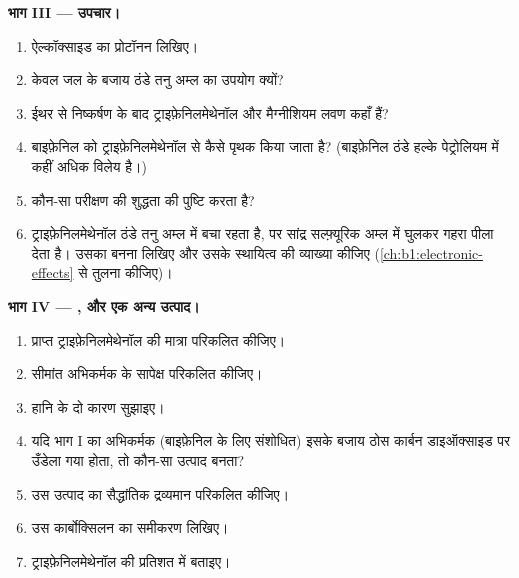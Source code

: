 \begin{problem}
\medskip
\noindent\textbf{भाग III --- उपचार।}
\begin{enumerate}[resume]
  \item ऐल्कॉक्साइड का प्रोटॉनन लिखिए।
  \item केवल जल के बजाय ठंडे तनु अम्ल का उपयोग क्यों?
  \item ईथर से निष्कर्षण के बाद ट्राइफ़ेनिलमेथेनॉल और मैग्नीशियम लवण
        कहाँ हैं?
  \item बाइफ़ेनिल को ट्राइफ़ेनिलमेथेनॉल से कैसे पृथक किया जाता है? (बाइफ़ेनिल ठंडे
        हल्के पेट्रोलियम में कहीं अधिक विलेय है।)
  \item कौन-सा परीक्षण  की शुद्धता की पुष्टि करता है?
  \item ट्राइफ़ेनिलमेथेनॉल ठंडे तनु अम्ल में बचा रहता है, पर
        सांद्र सल्फ़्यूरिक अम्ल में घुलकर गहरा पीला  देता है।
        उसका बनना लिखिए और उसके स्थायित्व की व्याख्या कीजिए
        (\cref{ch:b1:electronic-effects} से तुलना कीजिए)।
\end{enumerate}

\medskip
\noindent\textbf{भाग IV --- , और एक अन्य उत्पाद।}
\begin{enumerate}[resume]
  \item प्राप्त ट्राइफ़ेनिलमेथेनॉल की मात्रा परिकलित कीजिए।
  \item सीमांत अभिकर्मक के सापेक्ष  परिकलित कीजिए।
  \item हानि के दो कारण सुझाइए।
  \item यदि भाग I का अभिकर्मक (बाइफ़ेनिल के लिए संशोधित) इसके बजाय ठोस
        कार्बन डाइऑक्साइड पर उँडेला गया होता, तो कौन-सा उत्पाद बनता?
  \item उस उत्पाद का सैद्धांतिक द्रव्यमान परिकलित कीजिए।
  \item उस कार्बोक्सिलन का समीकरण लिखिए।
  \item ट्राइफ़ेनिलमेथेनॉल की  प्रतिशत में बताइए।
\end{enumerate}
\end{problem}
